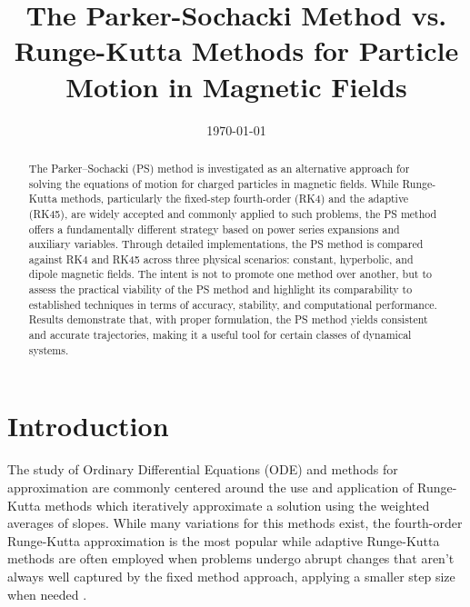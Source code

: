 \documentclass{article}
\title{The Parker-Sochacki Method vs. Runge-Kutta Methods for Particle Motion in Magnetic Fields
}
\date{\today}
\begin{document}
\maketitle

\begin{abstract}
The Parker–Sochacki (PS) method is investigated as an alternative approach for solving the equations of motion for charged particles in magnetic fields. While Runge-Kutta methods, particularly the fixed-step fourth-order (RK4) and the adaptive (RK45), are widely accepted and commonly applied to such problems, the PS method offers a fundamentally different strategy based on power series expansions and auxiliary variables. Through detailed implementations, the PS method is compared against RK4 and RK45 across three physical scenarios: constant, hyperbolic, and dipole magnetic fields. The intent is not to promote one method over another, but to assess the practical viability of the PS method and highlight its comparability to established techniques in terms of accuracy, stability, and computational performance. Results demonstrate that, with proper formulation, the PS method yields consistent and accurate trajectories, making it a useful tool for certain classes of dynamical systems.
\end{abstract}

\section{Introduction}
The study of Ordinary Differential Equations (ODE) and methods for approximation are commonly centered around the use and application of Runge-Kutta methods which iteratively approximate a solution using the weighted averages of slopes. While many variations for this methods exist, the fourth-order Runge-Kutta approximation is the most popular while adaptive Runge-Kutta methods are often employed when problems undergo abrupt changes that aren’t always well captured by the fixed method approach, applying a smaller step size when needed \cite{numericalmethods}.\\
\end{document}
